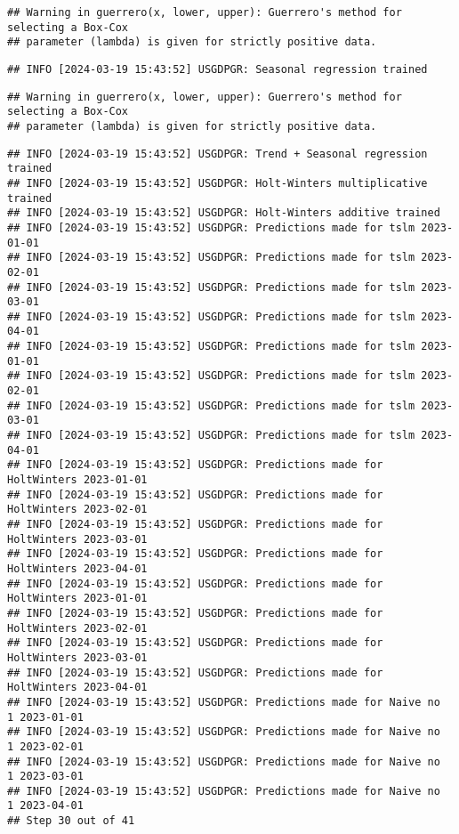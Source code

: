 \documentclass[
]{article}
\begin{document}
\begin{verbatim}
## Warning in guerrero(x, lower, upper): Guerrero's method for selecting a Box-Cox
## parameter (lambda) is given for strictly positive data.
\end{verbatim}

\begin{verbatim}
## INFO [2024-03-19 15:43:52] USGDPGR: Seasonal regression trained
\end{verbatim}

\begin{verbatim}
## Warning in guerrero(x, lower, upper): Guerrero's method for selecting a Box-Cox
## parameter (lambda) is given for strictly positive data.
\end{verbatim}

\begin{verbatim}
## INFO [2024-03-19 15:43:52] USGDPGR: Trend + Seasonal regression trained
## INFO [2024-03-19 15:43:52] USGDPGR: Holt-Winters multiplicative trained
## INFO [2024-03-19 15:43:52] USGDPGR: Holt-Winters additive trained
## INFO [2024-03-19 15:43:52] USGDPGR: Predictions made for tslm 2023-01-01
## INFO [2024-03-19 15:43:52] USGDPGR: Predictions made for tslm 2023-02-01
## INFO [2024-03-19 15:43:52] USGDPGR: Predictions made for tslm 2023-03-01
## INFO [2024-03-19 15:43:52] USGDPGR: Predictions made for tslm 2023-04-01
## INFO [2024-03-19 15:43:52] USGDPGR: Predictions made for tslm 2023-01-01
## INFO [2024-03-19 15:43:52] USGDPGR: Predictions made for tslm 2023-02-01
## INFO [2024-03-19 15:43:52] USGDPGR: Predictions made for tslm 2023-03-01
## INFO [2024-03-19 15:43:52] USGDPGR: Predictions made for tslm 2023-04-01
## INFO [2024-03-19 15:43:52] USGDPGR: Predictions made for HoltWinters 2023-01-01
## INFO [2024-03-19 15:43:52] USGDPGR: Predictions made for HoltWinters 2023-02-01
## INFO [2024-03-19 15:43:52] USGDPGR: Predictions made for HoltWinters 2023-03-01
## INFO [2024-03-19 15:43:52] USGDPGR: Predictions made for HoltWinters 2023-04-01
## INFO [2024-03-19 15:43:52] USGDPGR: Predictions made for HoltWinters 2023-01-01
## INFO [2024-03-19 15:43:52] USGDPGR: Predictions made for HoltWinters 2023-02-01
## INFO [2024-03-19 15:43:52] USGDPGR: Predictions made for HoltWinters 2023-03-01
## INFO [2024-03-19 15:43:52] USGDPGR: Predictions made for HoltWinters 2023-04-01
## INFO [2024-03-19 15:43:52] USGDPGR: Predictions made for Naive no  1 2023-01-01
## INFO [2024-03-19 15:43:52] USGDPGR: Predictions made for Naive no  1 2023-02-01
## INFO [2024-03-19 15:43:52] USGDPGR: Predictions made for Naive no  1 2023-03-01
## INFO [2024-03-19 15:43:52] USGDPGR: Predictions made for Naive no  1 2023-04-01
## Step 30 out of 41
\end{verbatim}
\end{document}
